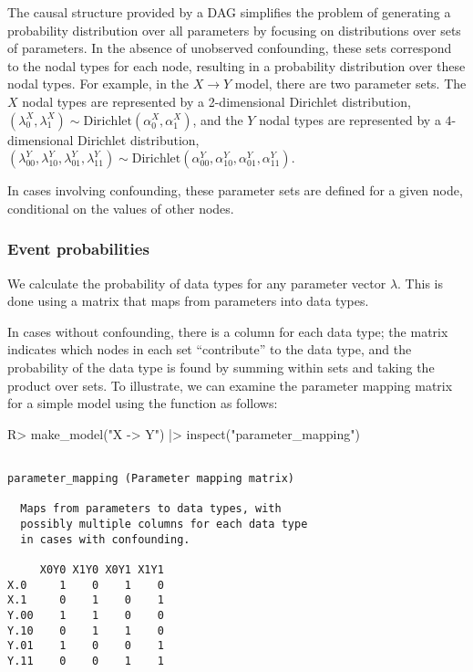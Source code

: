 \documentclass[
  11pt,
  article]{jss}
\renewcommand{\texttt}[1]{\code{#1}}
\begin{document}
The causal structure provided by a DAG simplifies the problem of
generating a probability distribution over all parameters by focusing on
distributions over sets of parameters. In the absence of unobserved
confounding, these sets correspond to the nodal types for each node,
resulting in a probability distribution over these nodal types. For
example, in the \(X \rightarrow Y\) model, there are two parameter sets.
The \(X\) nodal types are represented by a 2-dimensional Dirichlet
distribution,
\((\lambda^X_0, \lambda^X_1) \sim \text{Dirichlet}(\alpha^X_0, \alpha^X_1)\),
and the \(Y\) nodal types are represented by a \(4\)-dimensional
Dirichlet distribution,
\((\lambda^Y_{00}, \lambda^Y_{10}, \lambda^Y_{01}, \lambda^Y_{11}) \sim \text{Dirichlet}(\alpha^Y_{00}, \alpha^Y_{10}, \alpha^Y_{01}, \alpha^Y_{11})\).

In cases involving confounding, these parameter sets are defined for a
given node, conditional on the values of other nodes.

\subsubsection{Event probabilities}\label{event-probabilities}

We calculate the probability of data types for any parameter vector
\(\lambda\). This is done using a matrix that maps from parameters into
data types.

In cases without confounding, there is a column for each data type; the
matrix indicates which nodes in each set ``contribute'' to the data
type, and the probability of the data type is found by summing within
sets and taking the product over sets. To illustrate, we can examine the
parameter mapping matrix for a simple model using the \texttt{inspect()}
function as follows:

\begin{CodeInput}
R> make_model("X -> Y") |> inspect("parameter_mapping") 
\end{CodeInput}

\begin{verbatim}

parameter_mapping (Parameter mapping matrix) 

  Maps from parameters to data types, with
  possibly multiple columns for each data type
  in cases with confounding. 

     X0Y0 X1Y0 X0Y1 X1Y1
X.0     1    0    1    0
X.1     0    1    0    1
Y.00    1    1    0    0
Y.10    0    1    1    0
Y.01    1    0    0    1
Y.11    0    0    1    1
\end{verbatim}
\end{document}
